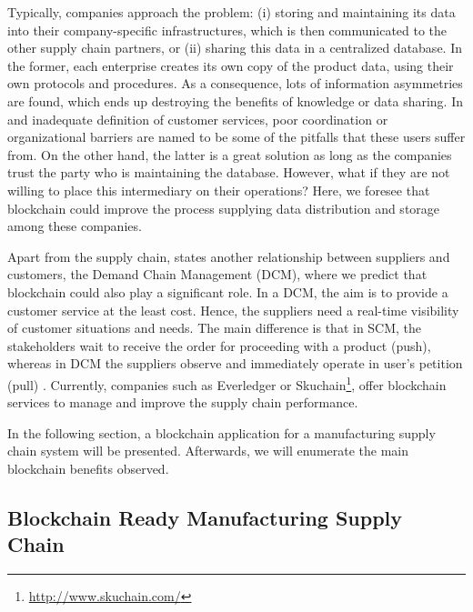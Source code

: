 Typically, companies approach the problem: (i) storing and maintaining its data into their company-specific infrastructures, which is then communicated to the other supply chain partners, or (ii) sharing this data in a centralized database. In the former, each enterprise creates its own copy of the product data, using their own protocols and procedures.  As a consequence, lots of information asymmetries are found, which ends up destroying the benefits of knowledge or data sharing. In \citep{lee1992managing} and \citep{fiala2005information} inadequate definition of customer services, poor coordination or organizational barriers are named to be some of the pitfalls that these users suffer from. On the other hand, the latter is a great solution as long as the companies trust the party who is maintaining the database. However, what if they are not willing to place this intermediary on their operations? Here, we foresee that blockchain could improve the process supplying data distribution and storage among these companies.

Apart from the supply chain, \citep{heikkila2002supply} states another relationship between suppliers and customers, the Demand Chain Management (DCM), where we predict that blockchain could also play a significant role. In a DCM, the aim is to provide a customer service at the least cost. Hence, the suppliers need a real-time visibility of customer situations and needs. The main difference is that in SCM, the stakeholders wait to receive the order for proceeding with a product (push), whereas in DCM the suppliers observe and immediately operate in user's petition (pull) \citep{wust2017you}. Currently, companies such as Everledger or Skuchain\footnote{\url{http://www.skuchain.com/}}, offer blockchain services to manage and improve the supply chain performance.
 
In the following section, a blockchain application for a manufacturing supply chain system will be presented. Afterwards, we will enumerate the main blockchain benefits observed.

\subsection{Blockchain Ready Manufacturing Supply Chain}

